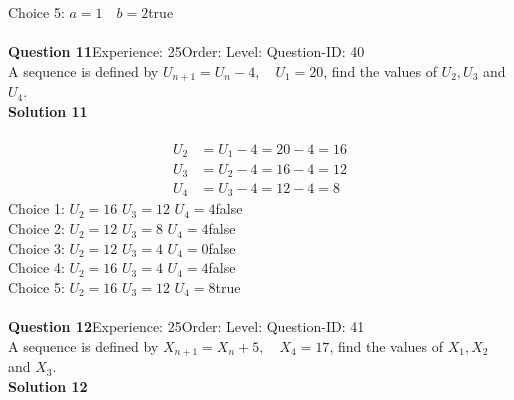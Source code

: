 \documentclass{article}
\begin{document}
Choice 5: \hspace{20pt}$a=1 \quad b=2$\hspace{20pt}true\\
\\[4pt]
\noindent\textbf{Question 11}\hspace{20pt}Experience: 25\hspace{20pt}Order: \hspace{20pt}Level: \hspace{20pt}Question-ID: 40\\[2pt]
A sequence is defined by $U_{n+1}=U_n-4, \quad U_1=20$, find the values of $U_2,U_3$ and $U_4$.\\[4pt]
\noindent\textbf{Solution 11}\\[2pt]
\\[-35pt]\begin{align*}
U_2&=U_1-4=20-4=16\\[2pt]
U_3&=U_2-4=16-4=12\\[2pt]
U_4&=U_3-4=12-4=8
\end{align*}
Choice 1: \hspace{20pt}$U_2=16 \,\, U_3=12 \,\, U_4=4$\hspace{20pt}false\\
Choice 2: \hspace{20pt}$U_2=12 \,\, U_3=8 \,\, U_4=4$\hspace{20pt}false\\
Choice 3: \hspace{20pt}$U_2=12 \,\, U_3=4 \,\, U_4=0$\hspace{20pt}false\\
Choice 4: \hspace{20pt}$U_2=16 \,\, U_3=4 \,\, U_4=4$\hspace{20pt}false\\
Choice 5: \hspace{20pt}$U_2=16 \,\, U_3=12 \,\, U_4=8$\hspace{20pt}true\\
\\[4pt]
\noindent\textbf{Question 12}\hspace{20pt}Experience: 25\hspace{20pt}Order: \hspace{20pt}Level: \hspace{20pt}Question-ID: 41\\[2pt]
A sequence is defined by $X_{n+1}=X_n+5, \quad X_4=17$, find the values of $X_1,X_2$ and $X_3$.\\[4pt]
\noindent\textbf{Solution 12}\\[2pt]
\end{document}
